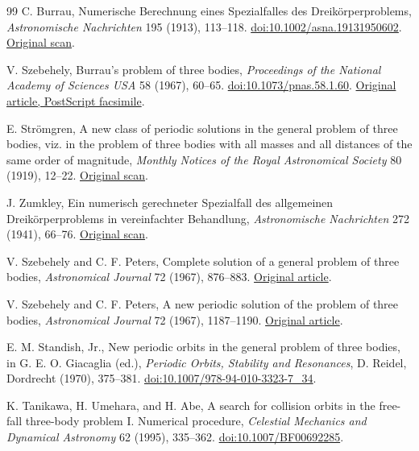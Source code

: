 \begin{thebibliography}{99}
C. Burrau, Numerische Berechnung eines Spezialfalles des Dreik\"orperproblems,
\emph{Astronomische Nachrichten} 195 (1913), 113--118.
\href{https://doi.org/10.1002/asna.19131950602}{doi:10.1002/asna.19131950602}.
\href{https://adsabs.harvard.edu/pdf/1913AN....195..113B}{Original scan}.

V. Szebehely, Burrau's problem of three bodies,
\emph{Proceedings of the National Academy of Sciences USA} 58 (1967), 60--65.
\href{https://doi.org/10.1073/pnas.58.1.60}{doi:10.1073/pnas.58.1.60}.
\href{https://www.ucolick.org/~laugh/oxide/projects/szebehely2.ps}{Original article, PostScript facsimile}.

E. Str\"omgren, A new class of periodic solutions in the general problem of
three bodies, viz. in the problem of three bodies with all masses and all
distances of the same order of magnitude,
\emph{Monthly Notices of the Royal Astronomical Society} 80 (1919), 12--22.
\href{https://articles.adsabs.harvard.edu/pdf/1919MNRAS..80...12S}{Original scan}.

J. Zumkley, Ein numerisch gerechneter Spezialfall des allgemeinen
Dreik\"orperproblems in vereinfachter Behandlung,
\emph{Astronomische Nachrichten} 272 (1941), 66--76.
\href{https://articles.adsabs.harvard.edu/pdf/1941AN....272...66Z}{Original scan}.

V. Szebehely and C. F. Peters, Complete solution of a general problem of
three bodies, \emph{Astronomical Journal} 72 (1967), 876--883.
\href{https://articles.adsabs.harvard.edu/pdf/1967AJ.....72..876S}{Original article}.

V. Szebehely and C. F. Peters, A new periodic solution of the problem of
three bodies, \emph{Astronomical Journal} 72 (1967), 1187--1190.
\href{https://adsabs.harvard.edu/pdf/1967AJ.....72.1187S}{Original article}.

E. M. Standish, Jr., New periodic orbits in the general problem of three
bodies, in G. E. O. Giacaglia (ed.), \emph{Periodic Orbits, Stability and
Resonances}, D. Reidel, Dordrecht (1970), 375--381.
\href{https://doi.org/10.1007/978-94-010-3323-7_34}{doi:10.1007/978-94-010-3323-7\_34}.

K. Tanikawa, H. Umehara, and H. Abe, A search for collision orbits in the
free-fall three-body problem I. Numerical procedure,
\emph{Celestial Mechanics and Dynamical Astronomy} 62 (1995), 335--362.
\href{https://doi.org/10.1007/BF00692285}{doi:10.1007/BF00692285}.


\end{thebibliography}
